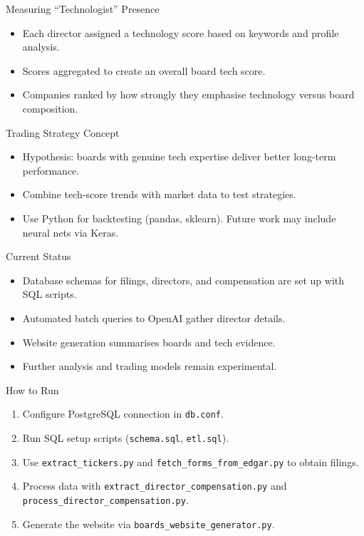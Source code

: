 \documentclass{beamer}
\begin{document}
\begin{frame}{Measuring \enquote{Technologist} Presence}
  \begin{itemize}
    \item Each director assigned a technology score based on keywords and profile analysis.
    \item Scores aggregated to create an overall board tech score.
    \item Companies ranked by how strongly they emphasise technology versus board composition.
  \end{itemize}
\end{frame}

\begin{frame}{Trading Strategy Concept}
  \begin{itemize}
    \item Hypothesis: boards with genuine tech expertise deliver better long-term performance.
    \item Combine tech-score trends with market data to test strategies.
    \item Use Python for backtesting (pandas, sklearn). Future work may include neural nets via Keras.
  \end{itemize}
\end{frame}

\begin{frame}{Current Status}
  \begin{itemize}
    \item Database schemas for filings, directors, and compensation are set up with SQL scripts.
    \item Automated batch queries to OpenAI gather director details.
    \item Website generation summarises boards and tech evidence.
    \item Further analysis and trading models remain experimental.
  \end{itemize}
\end{frame}

\begin{frame}{How to Run}
  \begin{enumerate}
    \item Configure PostgreSQL connection in \texttt{db.conf}.
    \item Run SQL setup scripts (\texttt{schema.sql}, \texttt{etl.sql}).
    \item Use \texttt{extract\_tickers.py} and \texttt{fetch\_forms\_from\_edgar.py} to obtain filings.
    \item Process data with \texttt{extract\_director\_compensation.py} and \texttt{process\_director\_compensation.py}.
    \item Generate the website via \texttt{boards\_website\_generator.py}.
  \end{enumerate}
\end{frame}
\end{document}
